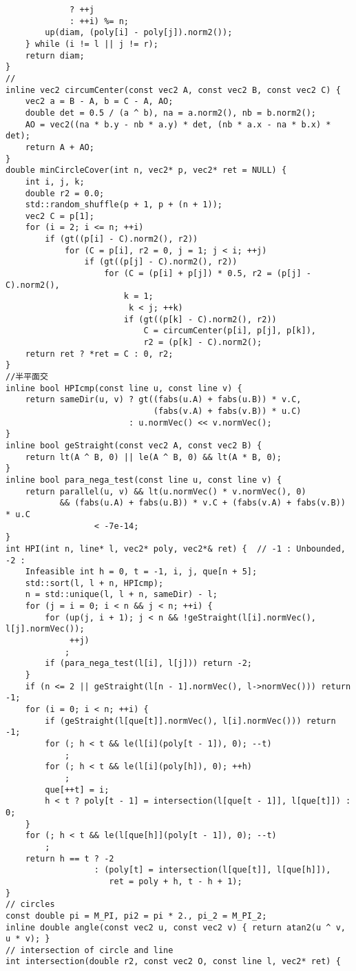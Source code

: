 \documentclass[twoside]{article}
\begin{document}
\begin{lstlisting}
		     ? ++j
		     : ++i) %= n;
		up(diam, (poly[i] - poly[j]).norm2());
	} while (i != l || j != r);
	return diam;
}
//
inline vec2 circumCenter(const vec2 A, const vec2 B, const vec2 C) {
	vec2 a = B - A, b = C - A, AO;
	double det = 0.5 / (a ^ b), na = a.norm2(), nb = b.norm2();
	AO = vec2((na * b.y - nb * a.y) * det, (nb * a.x - na * b.x) * det);
	return A + AO;
}
double minCircleCover(int n, vec2* p, vec2* ret = NULL) {
	int i, j, k;
	double r2 = 0.0;
	std::random_shuffle(p + 1, p + (n + 1));
	vec2 C = p[1];
	for (i = 2; i <= n; ++i)
		if (gt((p[i] - C).norm2(), r2))
			for (C = p[i], r2 = 0, j = 1; j < i; ++j)
				if (gt((p[j] - C).norm2(), r2))
					for (C = (p[i] + p[j]) * 0.5, r2 = (p[j] - C).norm2(),
					    k = 1;
					     k < j; ++k)
						if (gt((p[k] - C).norm2(), r2))
							C = circumCenter(p[i], p[j], p[k]),
							r2 = (p[k] - C).norm2();
	return ret ? *ret = C : 0, r2;
}
//半平面交
inline bool HPIcmp(const line u, const line v) {
	return sameDir(u, v) ? gt((fabs(u.A) + fabs(u.B)) * v.C,
	                          (fabs(v.A) + fabs(v.B)) * u.C)
	                     : u.normVec() << v.normVec();
}
inline bool geStraight(const vec2 A, const vec2 B) {
	return lt(A ^ B, 0) || le(A ^ B, 0) && lt(A * B, 0);
}
inline bool para_nega_test(const line u, const line v) {
	return parallel(u, v) && lt(u.normVec() * v.normVec(), 0)
	       && (fabs(u.A) + fabs(u.B)) * v.C + (fabs(v.A) + fabs(v.B)) * u.C
	              < -7e-14;
}
int HPI(int n, line* l, vec2* poly, vec2*& ret) {  // -1 : Unbounded, -2 :
	Infeasible int h = 0, t = -1, i, j, que[n + 5];
	std::sort(l, l + n, HPIcmp);
	n = std::unique(l, l + n, sameDir) - l;
	for (j = i = 0; i < n && j < n; ++i) {
		for (up(j, i + 1); j < n && !geStraight(l[i].normVec(), l[j].normVec());
		     ++j)
			;
		if (para_nega_test(l[i], l[j])) return -2;
	}
	if (n <= 2 || geStraight(l[n - 1].normVec(), l->normVec())) return -1;
	for (i = 0; i < n; ++i) {
		if (geStraight(l[que[t]].normVec(), l[i].normVec())) return -1;
		for (; h < t && le(l[i](poly[t - 1]), 0); --t)
			;
		for (; h < t && le(l[i](poly[h]), 0); ++h)
			;
		que[++t] = i;
		h < t ? poly[t - 1] = intersection(l[que[t - 1]], l[que[t]]) : 0;
	}
	for (; h < t && le(l[que[h]](poly[t - 1]), 0); --t)
		;
	return h == t ? -2
	              : (poly[t] = intersection(l[que[t]], l[que[h]]),
	                 ret = poly + h, t - h + 1);
}
// circles
const double pi = M_PI, pi2 = pi * 2., pi_2 = M_PI_2;
inline double angle(const vec2 u, const vec2 v) { return atan2(u ^ v, u * v); }
// intersection of circle and line
int intersection(double r2, const vec2 O, const line l, vec2* ret) {

\end{lstlisting}
\end{document}
